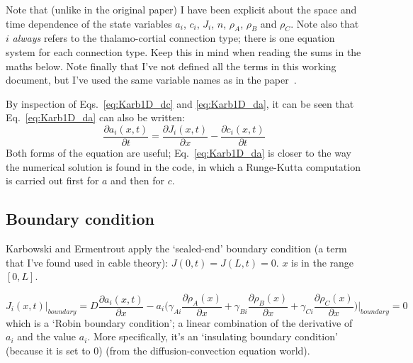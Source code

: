 \documentclass[11pt, a4paper]{article}
\begin{document}
Note that (unlike in the original paper) I have been explicit about
the space and time dependence of the state variables $a_i$, $c_i$,
$J_i$, $n$, $\rho_A$, $\rho_B$ and $\rho_C$. Note also that
$i$ \emph{always} refers to the thalamo-cortial connection type; there
is one equation system for each connection type. Keep this in mind
when reading the sums in the maths below. Note finally that I've not
defined all the terms in this working document, but I've used the same
variable names as in the paper~\cite{karbowski_model_2004}.

By inspection of Eqs.~\ref{eq:Karb1D_dc} and \ref{eq:Karb1D_da}, it
can be seen that Eq.~\ref{eq:Karb1D_da} can also be written:
%
\begin{equation} \label{eq:Karb1D_da_alt}
\frac{\partial a_i(x, t)}{\partial t} = \frac{\partial J_i(x, t)}{\partial
x} - \frac{\partial c_i(x, t)}{\partial t}
\end{equation}
%
Both forms of the equation are useful; Eq.~\ref{eq:Karb1D_da} is
closer to the way the numerical solution is found in the code, in
which a Runge-Kutta computation is carried out first for $a$ and then
for $c$.

\subsection{Boundary condition}

Karbowski and Ermentrout apply the `sealed-end' boundary condition (a
term that I've found used in cable theory):
%
$J(0,t) = J(L,t) = 0$. $x$ is in the range $[0,L]$.

\begin{equation}
J_i(x, t) \bigg\rvert_{boundary} = D \frac{\partial a_i(x, t)}{\partial x} - a_i
\bigg(\gamma_{Ai} \frac{\partial \rho_A(x)}{\partial x}
+\gamma_{Bi} \frac{\partial \rho_B(x)}{\partial x}
+ \gamma_{Ci} \frac{\partial \rho_C(x)}{\partial x} \bigg) \bigg\rvert_{boundary} = 0
\end{equation}
%
which is a `Robin boundary condition'; a linear combination of the
derivative of $a_i$ and the value $a_i$. More specifically, it's an
`insulating boundary condition' (because it is set to 0) (from the
diffusion-convection equation world).
\end{document}
